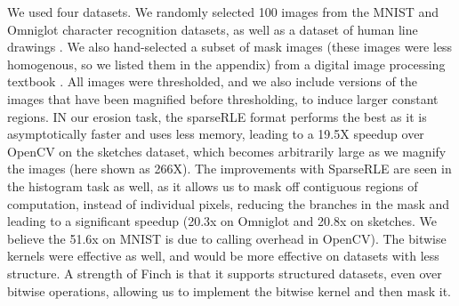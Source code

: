 We used four datasets. We randomly selected 100 images from the MNIST \cite{lecun_gradient-based_1998} and Omniglot \cite{lake_human-level_2015} character recognition datasets, as well as a dataset of human line drawings \cite{eitz_how_2012}. We also hand-selected a subset of mask images (these images were less homogenous, so we listed them in the appendix) from a digital image processing textbook \cite{gonzalez_digital_2006}. All images were thresholded, and we also include versions of the images that have been magnified before thresholding, to induce larger constant regions. IN our erosion task, the sparseRLE format performs the best as it is asymptotically faster and uses less memory, leading to a 19.5X speedup over OpenCV on the sketches dataset, which becomes arbitrarily large as we magnify the images (here shown as 266X). The improvements with SparseRLE are seen in the histogram task as well, as it allows us to
mask off contiguous regions of computation, instead of individual pixels, reducing the branches in the mask and leading to a significant speedup (20.3x on Omniglot and 20.8x on sketches. We believe the 51.6x on MNIST is due to calling overhead in OpenCV). The bitwise kernels were effective as well, and would be more effective on datasets with less structure. A strength of Finch is that it supports structured datasets, even over bitwise operations, allowing us to implement the bitwise kernel and then mask it.

